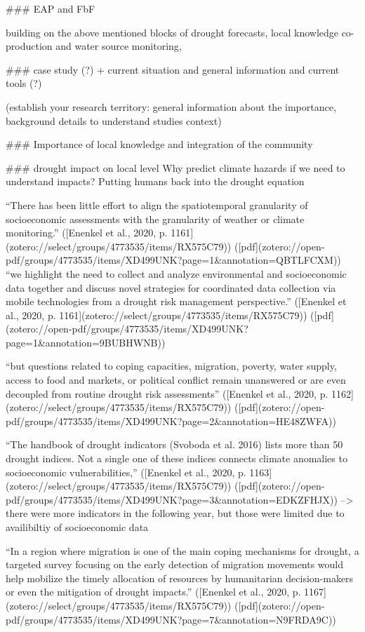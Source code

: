 \#\#\# EAP and FbF

building on the above mentioned blocks of drought forecasts, local knowledge co-production and water source monitoring, 

\#\#\# case study (?) + current situation and general information and current tools (?)

(establish your research territory: general information about the importance, background details to understand studies context)


\#\#\# Importance of local knowledge and integration of the community

\#\#\# drought impact on local level
Why predict climate hazards if we need to understand impacts? Putting humans back into the drought equation

“There has been little effort to align the spatiotemporal granularity of socioeconomic assessments with the granularity of weather or climate monitoring.” ([Enenkel et al., 2020, p. 1161](zotero://select/groups/4773535/items/RX575C79)) ([pdf](zotero://open-pdf/groups/4773535/items/XD499UNK?page=1&annotation=QBTLFCXM))
“we highlight the need to collect and analyze environmental and socioeconomic data together and discuss novel strategies for coordinated data collection via mobile technologies from a drought risk management perspective.” ([Enenkel et al., 2020, p. 1161](zotero://select/groups/4773535/items/RX575C79)) ([pdf](zotero://open-pdf/groups/4773535/items/XD499UNK?page=1&annotation=9BUBHWNB))

“but questions related to coping capacities, migration, poverty, water supply, access to food and markets, or political conflict remain unanswered or are even decoupled from routine drought risk assessments” ([Enenkel et al., 2020, p. 1162](zotero://select/groups/4773535/items/RX575C79)) ([pdf](zotero://open-pdf/groups/4773535/items/XD499UNK?page=2&annotation=HE48ZWFA))

“The handbook of drought indicators (Svoboda et al. 2016) lists more than 50 drought indices. Not a single one of these indices connects climate anomalies to socioeconomic vulnerabilities,” ([Enenkel et al., 2020, p. 1163](zotero://select/groups/4773535/items/RX575C79)) ([pdf](zotero://open-pdf/groups/4773535/items/XD499UNK?page=3&annotation=EDKZFHJX))
--> there were more indicators in the following year, but those were limited due to availibiltiy of socioeconomic data

“In a region where migration is one of the main coping mechanisms for drought, a targeted survey focusing on the early detection of migration movements would help mobilize the timely allocation of resources by humanitarian decision-makers or even the mitigation of drought impacts.” ([Enenkel et al., 2020, p. 1167](zotero://select/groups/4773535/items/RX575C79)) ([pdf](zotero://open-pdf/groups/4773535/items/XD499UNK?page=7&annotation=N9FRDA9C))

